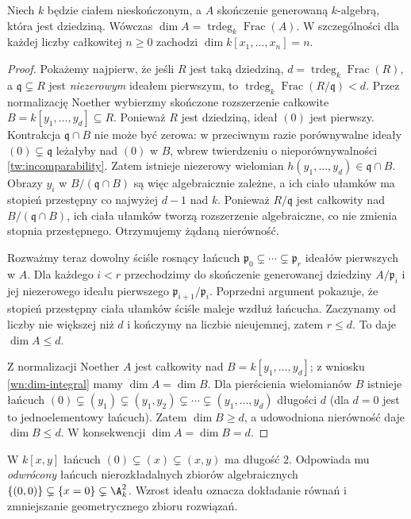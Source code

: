 \begin{twierdzenie}
\label{tw:dim-trdeg}
Niech $k$ będzie ciałem nieskończonym, a $A$
skończenie generowaną $k$-algebrą, która jest dziedziną.
Wówczas
$\dim A=\operatorname{trdeg}_k\operatorname{Frac}(A)$.
W szczególności dla każdej liczby całkowitej $n\ge0$
zachodzi $\dim k[x_1,\ldots,x_n]=n$.
\end{twierdzenie}
\begin{proof}
Pokażemy najpierw, że jeśli $R$ jest taką dziedziną,
$d=\operatorname{trdeg}_k\operatorname{Frac}(R)$,
a $\mathfrak q\subsetneq R$ jest \emph{niezerowym}
ideałem pierwszym, to
$\operatorname{trdeg}_k\operatorname{Frac}(R/\mathfrak q)<d$.
Przez normalizację Noether wybierzmy skończone
rozszerzenie całkowite
$B=k[y_1,\ldots,y_d]\subseteq R$.
Ponieważ $R$ jest dziedziną, ideał $(0)$ jest
pierwszy. Kontrakcja $\mathfrak q\cap B$ nie może
być zerowa: w przeciwnym razie porównywalne ideały
$(0)\subsetneq\mathfrak q$ leżałyby nad $(0)$ w $B$,
wbrew twierdzeniu o nieporównywalności
\ref{tw:incomparability}.
Zatem istnieje niezerowy wielomian
$h(y_1,\ldots,y_d)\in\mathfrak q\cap B$.
Obrazy $y_i$ w $B/(\mathfrak q\cap B)$ są więc
algebraicznie zależne, a ich ciało ułamków ma
stopień przestępny co najwyżej $d-1$ nad $k$.
Ponieważ $R/\mathfrak q$ jest całkowity nad
$B/(\mathfrak q\cap B)$, ich ciała ułamków tworzą
rozszerzenie algebraiczne, co nie zmienia stopnia
przestępnego. Otrzymujemy żądaną nierówność.

Rozważmy teraz dowolny ściśle rosnący łańcuch
$\mathfrak p_0\subsetneq\cdots\subsetneq
\mathfrak p_r$ ideałów pierwszych w $A$.
Dla każdego $i<r$ przechodzimy do skończenie
generowanej dziedziny $A/\mathfrak p_i$ i jej
niezerowego ideału pierwszego
$\mathfrak p_{i+1}/\mathfrak p_i$. Poprzedni
argument pokazuje, że stopień przestępny ciała
ułamków ściśle maleje wzdłuż łańcucha.
Zaczynamy od liczby nie większej niż $d$ i kończymy
na liczbie nieujemnej, zatem $r\le d$.
To daje $\dim A\le d$.

Z normalizacji Noether $A$ jest całkowity nad
$B=k[y_1,\ldots,y_d]$; z wniosku
\ref{wn:dim-integral} mamy $\dim A=\dim B$.
Dla pierścienia wielomianów $B$ istnieje łańcuch
$(0)\subsetneq(y_1)\subsetneq(y_1,y_2)
\subsetneq\cdots\subsetneq(y_1,\ldots,y_d)$
długości $d$ (dla $d=0$ jest to jednoelementowy
łańcuch). Zatem $\dim B\ge d$, a udowodniona
nierówność daje $\dim B\le d$. W konsekwencji
$\dim A=\dim B=d$.
\end{proof}

\begin{przyklad}
W $k[x,y]$ łańcuch
$(0)\subsetneq(x)\subsetneq(x,y)$
ma długość $2$. Odpowiada mu \emph{odwrócony}
łańcuch nierozkładalnych zbiorów algebraicznych
$\{(0,0)\}\subsetneq\{x=0\}\subsetneq\A^2_k$.
Wzrost ideału oznacza dokładanie równań i
zmniejszanie geometrycznego zbioru rozwiązań.
\end{przyklad}

